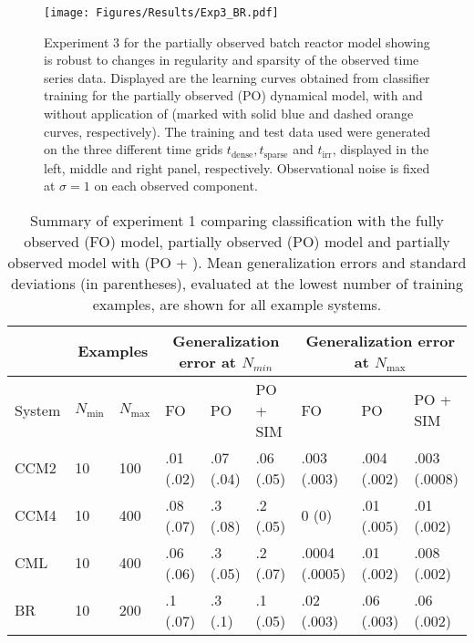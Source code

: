 \begin{figure*}[t!]
    \centering
    \texttt{[image: Figures/Results/Exp3\_BR.pdf]}
    \caption{Experiment 3 for the partially observed batch reactor model showing \myMethod{} is robust to changes in regularity and sparsity of the observed time series data.
    Displayed are the learning curves obtained from classifier training for the partially observed (PO) dynamical model, with and without application of \myMethod{} (marked with solid blue and dashed orange curves, respectively).
    The training and test data used were generated on the three different time grids $t_{\text{dense}}, t_{\text{sparse}}$ and $t_{\text{irr}}$, displayed in the left, middle and right panel, respectively.
    Observational noise is fixed at $\sigma = 1$ on each observed component.
    }
    \label{fig:exp3_BR}
\end{figure*}

\begin{table*}[t!]
    \centering
    \caption{
    Summary of experiment 1 comparing classification with the fully observed (FO) model, partially observed (PO) model and partially observed model with \myMethod{} (PO + \myMethod{}).
    Mean generalization errors and standard deviations (in parentheses), evaluated at the lowest number of training examples, are shown for all example systems.
    }
    \begin{tabular}{p{1cm}|p{0.95cm}p{0.95cm}|p{1.8cm}p{1.8cm}p{1.8cm}|p{2cm}p{2cm}p{2cm}} %
        \hline
        \multicolumn{1}{c}{} & \multicolumn{2}{|c|}{Examples} & \multicolumn{3}{c|}{Generalization error at $N_{min}$} & \multicolumn{3}{c}{Generalization error at $N_{\max}$}  \\
        \hline
            System & $N_{\min}$ & $N_{\max}$ & FO & PO & PO + SIM & FO & PO & PO + SIM \\
        \hline
        CCM2 & 10 & 100 & .01 (.02) & .07 (.04) & .06 (.05) & .003 (.003) & .004 (.002) & .003 (.0008) \\
        CCM4 & 10 & 400 & .08 (.07) & .3 (.08) & .2 (.05) & 0 (0) & .01 (.005) & .01 (.002) \\
        CML & 10 & 400 & .06 (.06) & .3 (.05) & .2 (.07) & .0004 (.0005) & .01 (.002) & .008 (.002) \\
        BR & 10 & 200 & .1 (.07) & .3 (.1) & .1 (.05) & .02 (.003) & .06 (.003) & .06 (.002) \\
        \hline
    \end{tabular}
    \label{tab:experiment_1}
\end{table*}

